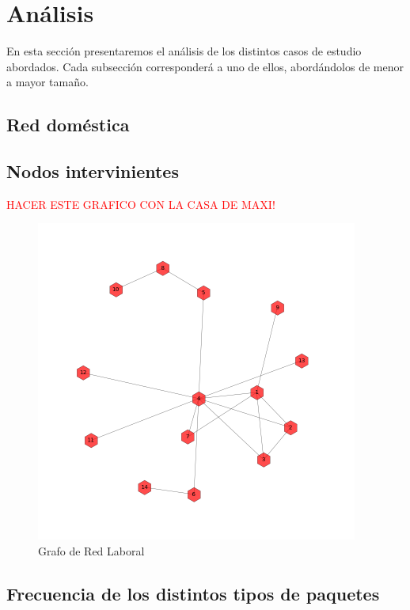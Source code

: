 \section{Análisis}

En esta sección presentaremos el análisis de los distintos casos de estudio abordados. Cada subsección corresponderá a uno de ellos, abordándolos de menor a mayor tamaño.

\subsection{Red doméstica}

\subsection{Nodos intervinientes}
\textcolor{red}{HACER ESTE GRAFICO CON LA CASA DE MAXI!}
\begin{figure}[h!]
    \centering                                                       
    \includegraphics[width=300pt]{img/laboralGraph.png}
    \caption{Grafo de Red Laboral}
    \label{laboral:graph}
\end{figure}

\subsection{Frecuencia de los distintos tipos de paquetes}


